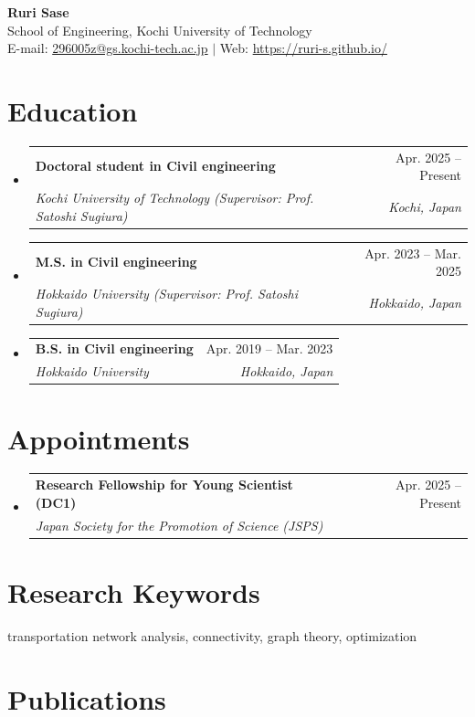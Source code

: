 \documentclass[letterpaper,11pt]{article}
\makeatletter
\newcommand{\resumeSubheading}[4]{
  \vspace{-2pt}\item
    \begin{tabular*}{0.97\textwidth}[t]{l@{\extracolsep{\fill}}r}
      \textbf{#1} & #2 \\
      \textit{\small #3} & \textit{\small #4} \\
    \end{tabular*}\vspace{-5pt}
}
\newcommand{\resumeSubHeadingListStart}{\begin{itemize}[leftmargin=0.15in, label={}]}
\newcommand{\resumeSubHeadingListEnd}{\end{itemize}}
\makeatother
\begin{document}
\begin{center}
    {\sffamily\Huge\bfseries Ruri Sase} \\ \vspace{5pt}
    \small{School of Engineering, Kochi University of Technology} \\
    \small{E-mail: \href{mailto:296005z@gs.kochi-tech.ac.jp}{\color{blue}296005z@gs.kochi-tech.ac.jp} $|$ Web: \href{https://ruri-s.github.io/}{\color{blue}https://ruri-s.github.io/}}
\end{center}

\section{Education}
\resumeSubHeadingListStart
    \resumeSubheading
      {Doctoral student in Civil engineering}{Apr. 2025 -- Present}
      {Kochi University of Technology (Supervisor: Prof. Satoshi Sugiura)}{Kochi, Japan}
    \resumeSubheading
      {M.S. in Civil engineering}{Apr. 2023 -- Mar. 2025}
      {Hokkaido University (Supervisor: Prof. Satoshi Sugiura)}{Hokkaido, Japan}
    \resumeSubheading
      {B.S. in Civil engineering}{Apr. 2019 -- Mar. 2023}
      {Hokkaido University}{Hokkaido, Japan}
\resumeSubHeadingListEnd

\section{Appointments}
\resumeSubHeadingListStart
    \resumeSubheading
      {Research Fellowship for Young Scientist (DC1)}{Apr. 2025 -- Present}
      {Japan Society for the Promotion of Science (JSPS)}{}
\resumeSubHeadingListEnd

\section{Research Keywords}
\begin{itemize}[leftmargin=0.15in, label={}]
    \small{\item{
    transportation network analysis, connectivity, graph theory, optimization
    }}
\end{itemize}

\section{Publications}
\end{document}

